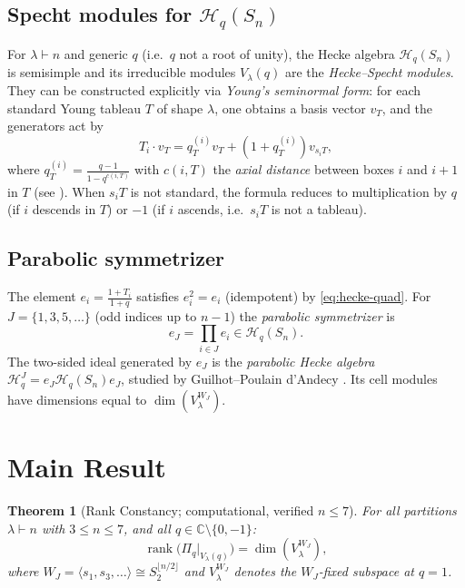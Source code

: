 \documentclass[12pt]{article}
\newtheorem{theorem}{Theorem}[section]
\theoremstyle{remark}
\theoremstyle{definition}
\begin{document}
\subsection{Specht modules for $\mathcal{H}_q(S_n)$}

For $\lambda \vdash n$ and generic $q$ (i.e.\ $q$ not a root of unity), the Hecke algebra
$\mathcal{H}_q(S_n)$ is semisimple and its irreducible modules $V_\lambda(q)$ are the
\emph{Hecke--Specht modules}.  They can be constructed explicitly via
\emph{Young's seminormal form}: for each standard Young tableau $T$ of shape $\lambda$, one
obtains a basis vector $v_T$, and the generators act by
\begin{equation}
  T_i \cdot v_T = q_T^{(i)} v_T + (1 + q_T^{(i)}) v_{s_i T},
  \label{eq:seminormal}
\end{equation}
where $q_T^{(i)} = \frac{q - 1}{1 - q^{c(i,T)}}$ with $c(i,T)$ the \emph{axial distance}
between boxes $i$ and $i+1$ in $T$ (see \cite{Hoefsmit1974, RamYip}).
When $s_i T$ is not standard, the formula reduces to multiplication by $q$ (if $i$ descends in
$T$) or $-1$ (if $i$ ascends, i.e.\ $s_i T$ is not a tableau).

\subsection{Parabolic symmetrizer}

The element $e_i = \frac{1+T_i}{1+q}$ satisfies $e_i^2 = e_i$ (idempotent) by
\eqref{eq:hecke-quad}.  For $J = \{1, 3, 5, \ldots\}$ (odd indices up to $n-1$) the
\emph{parabolic symmetrizer} is
\[
  e_J = \prod_{i \in J} e_i \in \mathcal{H}_q(S_n).
\]
The two-sided ideal generated by $e_J$ is the \emph{parabolic Hecke algebra}
$\mathcal{H}_q^J = e_J \mathcal{H}_q(S_n) e_J$, studied by Guilhot--Poulain d'Andecy
\cite{GuilhotPdA2025}.  Its cell modules have dimensions equal to $\dim(V_\lambda^{W_J})$.

\section{Main Result}

\begin{theorem}[Rank Constancy; computational, verified $n \leq 7$]
\label{thm:main}
For all partitions $\lambda \vdash n$ with $3 \leq n \leq 7$, and all
$q \in \mathbb{C} \setminus \{0,-1\}$:
\[
  \operatorname{rank}\!\bigl(\Pi_q\big|_{V_\lambda(q)}\bigr) = \dim(V_\lambda^{W_J}),
\]
where $W_J = \langle s_1, s_3, \ldots\rangle \cong S_2^{\lfloor n/2\rfloor}$ and
$V_\lambda^{W_J}$ denotes the $W_J$-fixed subspace at $q = 1$.
\end{theorem}
\end{document}
